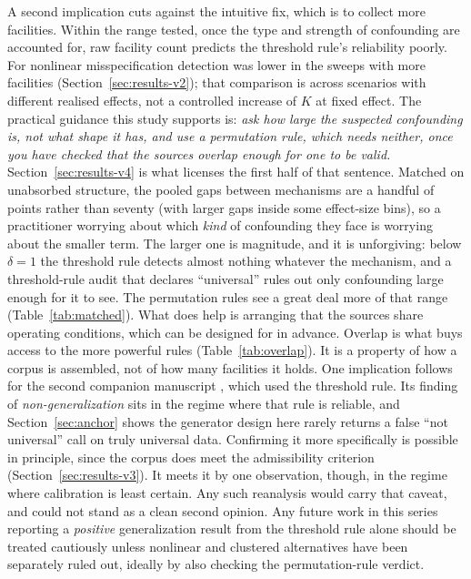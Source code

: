 \documentclass[journal=dce]{CUP-JNL-DTM}%
\begin{document}
A second implication cuts against the intuitive fix, which is to collect more facilities. Within the range tested, once the type and strength of confounding are accounted for, raw facility count predicts the threshold rule's reliability poorly. For nonlinear misspecification detection was lower in the sweeps with more facilities (Section~\ref{sec:results-v2}); that comparison is across scenarios with different realised effects, not a controlled increase of $K$ at fixed effect. The practical guidance this study supports is: \emph{ask how large the suspected confounding is, not what shape it has, and use a permutation rule, which needs neither, once you have checked that the sources overlap enough for one to be valid.} Section~\ref{sec:results-v4} is what licenses the first half of that sentence. Matched on unabsorbed structure, the pooled gaps between mechanisms are a handful of points rather than seventy (with larger gaps inside some effect-size bins), so a practitioner worrying about which \emph{kind} of confounding they face is worrying about the smaller term. The larger one is magnitude, and it is unforgiving: below $\delta=1$ the threshold rule detects almost nothing whatever the mechanism, and a threshold-rule audit that declares ``universal'' rules out only confounding large enough for it to see. The permutation rules see a great deal more of that range (Table~\ref{tab:matched}). What does help is arranging that the sources share operating conditions, which can be designed for in advance. Overlap is what buys access to the more powerful rules (Table~\ref{tab:overlap}). It is a property of how a corpus is assembled, not of how many facilities it holds. One implication follows for the second companion manuscript \citep{gilruiz2026paper2}, which used the threshold rule. Its finding of \emph{non-generalization} sits in the regime where that rule is reliable, and Section~\ref{sec:anchor} shows the generator design here rarely returns a false ``not universal'' call on truly universal data. Confirming it more specifically is possible in principle, since the corpus does meet the admissibility criterion (Section~\ref{sec:results-v3}). It meets it by one observation, though, in the regime where calibration is least certain. Any such reanalysis would carry that caveat, and could not stand as a clean second opinion. Any future work in this series reporting a \emph{positive} generalization result from the threshold rule alone should be treated cautiously unless nonlinear and clustered alternatives have been separately ruled out, ideally by also checking the permutation-rule verdict.
\end{document}
